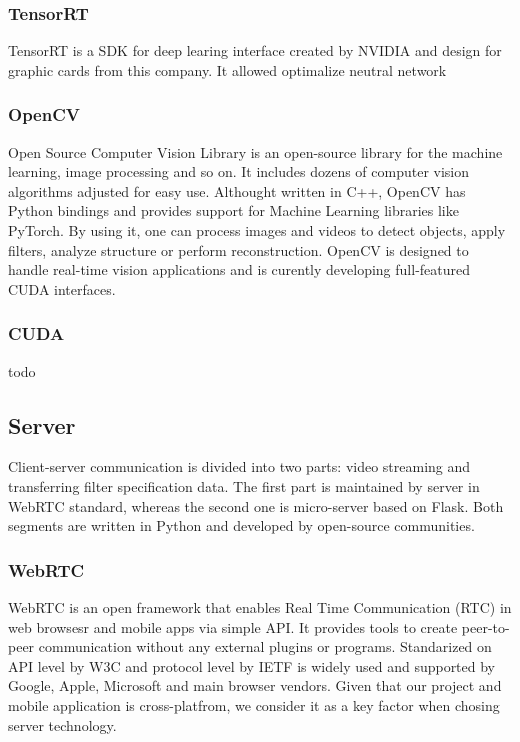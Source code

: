 \documentclass[../Main.tex]{subfiles}
\begin{document}
    \subsubsection{TensorRT}
    TensorRT is a SDK for deep learing interface created by NVIDIA and design for graphic cards from this company. It allowed optimalize neutral network 
    
    \subsubsection{OpenCV}
    Open Source Computer Vision Library is an open-source library for the machine learning, image processing and so on. It includes dozens of computer vision algorithms adjusted for easy use. Althought written in C++, OpenCV has Python bindings and provides support for Machine Learning libraries like PyTorch.  By using it, one can process images and videos to detect objects, apply filters, analyze structure or perform reconstruction. OpenCV is designed to handle real-time vision applications and is curently developing full-featured CUDA interfaces.
        
    \subsubsection{CUDA}
    todo
    
\newpage
\subsection{Server}
    Client-server communication is divided into two parts: video streaming and transferring filter specification data. The first part is maintained by server in WebRTC standard, whereas the second one is micro-server based on Flask. Both segments are written in Python and developed by open-source communities.

    \subsubsection{WebRTC}
    WebRTC is an open framework that enables Real Time Communication (RTC) in web browsesr and mobile apps via simple API. It provides tools to create peer-to-peer communication without any external plugins or programs. Standarized on API level by W3C  and protocol level by IETF  is widely used and supported by Google, Apple, Microsoft and main browser vendors. Given that our project and mobile application is cross-platfrom, we consider it as a key factor when chosing server technology.
    
\end{document}
